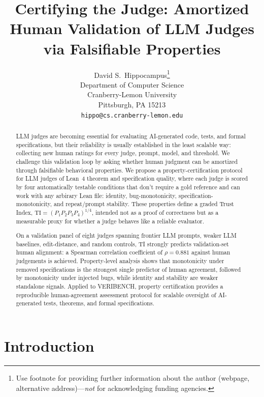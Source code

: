 \documentclass{article}
\title{Certifying the Judge: Amortized Human Validation of LLM Judges via Falsifiable Properties}
\author{%
  David S.~Hippocampus\thanks{Use footnote for providing further information
    about the author (webpage, alternative address)---\emph{not} for acknowledging
    funding agencies.} \\
  Department of Computer Science\\
  Cranberry-Lemon University\\
  Pittsburgh, PA 15213 \\
  \texttt{hippo@cs.cranberry-lemon.edu} \\
}
\begin{document}
\maketitle

\begin{abstract}
  LLM judges are becoming essential for evaluating AI-generated code, tests, and formal specifications, but their reliability is usually established in the least scalable way: collecting new human ratings for every judge, prompt, model, and threshold. We challenge this validation loop by asking whether human judgment can be amortized through falsifiable behavioral properties. We propose a property-certification protocol for LLM judges of Lean~4 theorem and specification quality, where each judge is scored by four automatically testable conditions that don't require a gold reference and can work with any arbirary Lean file: identity, bug-monotonicity, specification-monotonicity, and repeat/prompt stability. These properties define a graded Trust Index, $\mathrm{TI}=(P_1P_2P_3P_4)^{1/4}$, intended not as a proof of correctness but as a measurable proxy for whether a judge behaves like a reliable evaluator.

  On a validation panel of eight judges spanning frontier LLM prompts, weaker LLM baselines, edit-distance, and random controls, TI strongly predicts validation-set human alignment: a Spearman correlation coefficient of $\rho=0.881$ against human judgements is achieved. Property-level analysis shows that monotonicity under removed specifications is the strongest single predictor of human agreement, followed by monotonicity under injected bugs, while identity and stability are weaker standalone signals. Applied to VERIBENCH, property certification provides a reproducible human-agreement assessment protocol for scalable oversight of AI-generated tests, theorems, and formal specifications.
\end{abstract}

\section{Introduction}
\end{document}

